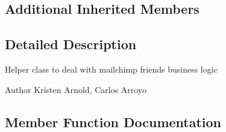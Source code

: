 \subsection*{Additional Inherited Members}


\subsection{Detailed Description}
Helper class to deal with mailchimp friends business logic \begin{DoxyAuthor}{Author}
Kristen Arnold, Carlos Arroyo 
\end{DoxyAuthor}


\subsection{Member Function Documentation}
\hypertarget{classDMA_1_1Friends_1_1Classes_1_1Mailchimp_1_1MailchimpClient_a35c83f2795213a432c56477e417db249}{}
